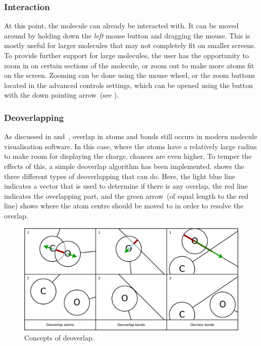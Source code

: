 \subsubsection{Interaction}
At this point, the molecule can already be interacted with. It can be moved around by holding down the \emph{left} mouse button and dragging the mouse. This is mostly useful for larger molecules that may not completely fit on smaller screens. To provide further support for large molecules, the user has the opportunity to zoom in on certain sections of the molecule, or zoom out to make more atoms fit on the screen. Zooming can be done using the mouse wheel, or the zoom buttons located in the advanced controls settings, which can be opened using the button with the down pointing arrow~(see ).


\subsubsection{Deoverlapping}
As discussed in  and~\cite{clark2006structure}, overlap in atoms and bonds still occurs in modern molecule visualisation software. In this case, where the atoms have a relatively large radius to make room for displaying the charge, chances are even higher. To temper the effects of this, a simple deoverlap algorithm has been implemented.  shows the three different types of deoverlapping that \oframp{} can do. Here, the light blue line indicates a vector that is used to determine if there is any overlap, the red line indicates the overlapping part, and the green arrow~(of equal length to the red line) shows where the atom centre should be moved to in order to resolve the overlap.

\begin{figure}
\begin{center}
\includegraphics[width=\textwidth]{img/deoverlap.pdf}
\caption{Concepts of deoverlap.}
\end{center}
\end{figure}

